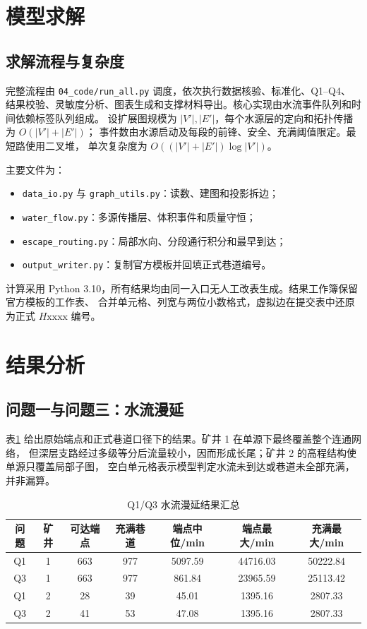 \section{模型求解}

\subsection{求解流程与复杂度}
完整流程由 \texttt{04\_code/run\_all.py} 调度，依次执行数据核验、标准化、Q1--Q4、
结果校验、灵敏度分析、图表生成和支撑材料导出。核心实现由水流事件队列和时间依赖标签队列组成。
设扩展图规模为 $|V'|,|E'|$，每个水源层的定向和拓扑传播为 $O(|V'|+|E'|)$；
事件数由水源启动及每段的前锋、安全、充满阈值限定。最短路使用二叉堆，
单次复杂度为 $O((|V'|+|E'|)\log |V'|)$。

主要文件为：
\begin{itemize}
  \item \texttt{data\_io.py} 与 \texttt{graph\_utils.py}：读数、建图和投影拆边；
  \item \texttt{water\_flow.py}：多源传播层、体积事件和质量守恒；
  \item \texttt{escape\_routing.py}：局部水向、分段通行积分和最早到达；
  \item \texttt{output\_writer.py}：复制官方模板并回填正式巷道编号。
\end{itemize}

计算采用 Python 3.10，所有结果均由同一入口无人工改表生成。结果工作簿保留官方模板的工作表、
合并单元格、列宽与两位小数格式，虚拟边在提交表中还原为正式 $H\mathrm{xxxx}$ 编号。

\section{结果分析}
\subsection{问题一与问题三：水流漫延}
表\ref{tab:water-results} 给出原始端点和正式巷道口径下的结果。矿井 1 在单源下最终覆盖整个连通网络，
但深层支路经过多级等分后流量较小，因而形成长尾；矿井 2 的高程结构使单源只覆盖局部子图，
空白单元格表示模型判定水流未到达或巷道未全部充满，并非漏算。

\begin{table}[H]
\centering
\caption{Q1/Q3 水流漫延结果汇总}
\label{tab:water-results}
\begin{tabular}{ccccccc}
\toprule
问题 & 矿井 & 可达端点 & 充满巷道 & 端点中位/min & 端点最大/min & 充满最大/min\\
\midrule
Q1 & 1 & 663 & 977 & 5097.59 & 44716.03 & 50222.84\\
Q3 & 1 & 663 & 977 & 861.84 & 23965.59 & 25113.42\\
Q1 & 2 & 28 & 39 & 45.01 & 1395.16 & 2807.33\\
Q3 & 2 & 41 & 53 & 47.08 & 1395.16 & 2807.33\\
\bottomrule
\end{tabular}
\end{table}

